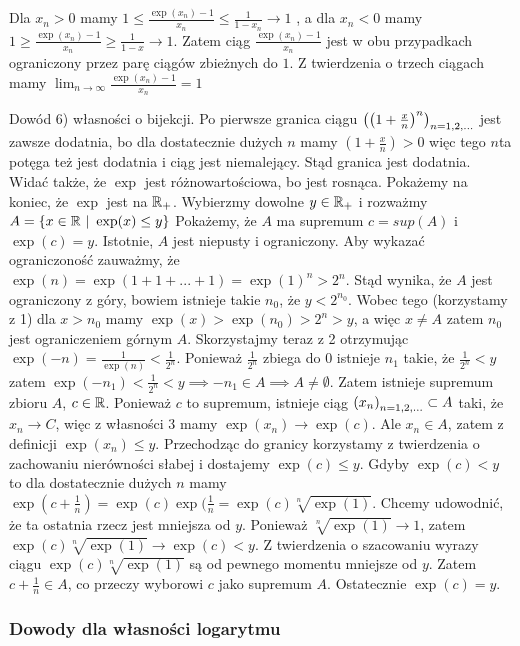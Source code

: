 \documentclass[9pt]{article}
\begin{document}
Dla $x_n > 0$ mamy $1 \le \frac{\exp(x_n) - 1}{x_n} \le \frac{1}{1-x_n} \to 1$ , a dla $x_n < 0$
mamy $1 \ge \frac{\exp(x_n) - 1}{x_n} \ge \frac{1}{1-x} \to 1$. Zatem ciąg $\frac{\exp(x_n) -
1}{x_n}$ jest w obu przypadkach ograniczony przez parę ciągów zbieżnych do $1$. Z twierdzenia o
trzech ciągach mamy $\lim_{n \to \infty} \frac{\exp(x_n)-1}{x_n} = 1$

\bigbreak

Dowód 6) własności o bijekcji. Po pierwsze granica ciągu $\left(\left(1+\frac{x}{n}\right)^n\right)_{n = 1,2,...}$ jest
zawsze dodatnia, bo dla dostatecznie dużych $n$ mamy $\left(1 + \frac{x}{n}\right) > 0$ więc tego
$n$ta potęga też jest dodatnia i ciąg jest niemalejący. Stąd granica jest dodatnia. Widać także, że
$\exp$ jest różnowartościowa, bo jest rosnąca. Pokażemy na koniec, że $\exp$ jest na $\mathbb{R}_+$.
Wybierzmy dowolne $y \in \mathbb{R}_+$ i rozważmy $A = \left\{x \in \mathbb{R} \ |\  \exp(x) \le y\right\}$ Pokażemy,
że $A$ ma supremum $c = sup(A)$ i $\exp(c) = y$. Istotnie, $A$ jest niepusty i ograniczony. Aby
wykazać ograniczoność zauważmy, że $\exp(n) = \exp(1 + 1 + ... + 1) = \exp(1)^n > 2^n$. Stąd wynika,
że $A$ jest ograniczony z góry, bowiem istnieje takie $n_0$, że $y < 2^{n_0}$. Wobec tego
(korzystamy z 1) dla $x > n_0$ mamy $\exp(x) > \exp(n_0) > 2^n > y$, a więc $x \ne A$ zatem $n_0$
jest ograniczeniem górnym $A$. Skorzystajmy teraz z 2 otrzymując $\exp(-n) = \frac{1}{\exp(n)} <
\frac{1}{2^n}$. Ponieważ $\frac{1}{2^n}$ zbiega do $0$ istnieje $n_1$ takie, że $\frac{1}{2^n} < y$
zatem $\exp(-n_1) < \frac{1}{2^n} < y \implies -n_1 \in A \implies A \ne \emptyset$. Zatem istnieje
supremum zbioru $A$, $c \in \mathbb{R}$. Ponieważ $c$ to supremum, istnieje ciąg $\left(x_n\right)_{n = 1,2,...} \subset A$ taki,
że $x_n \to C$, więc z własności 3 mamy $\exp(x_n) \to \exp(c)$. Ale $x_n \in A$, zatem z definicji
$\exp(x_n) \le y$. Przechodząc do granicy korzystamy z twierdzenia o zachowaniu nierówności słabej i
dostajemy $\exp(c) \le y$. Gdyby $\exp(c) < y$ to dla dostatecznie dużych $n$ mamy
$\exp(c+\frac{1}{n}) = \exp(c) \exp(\frac{1}{n} = \exp(c) \sqrt[n]{\exp(1)}$. Chcemy udowodnić, że
ta ostatnia rzecz jest mniejsza od $y$. Ponieważ $\sqrt[n]{\exp(1)} \to 1$, zatem $\exp(c)
\sqrt[n]{\exp(1)} \to \exp(c) < y$. Z twierdzenia o szacowaniu wyrazy ciągu $\exp(c)
\sqrt[n]{\exp(1)}$ są od pewnego momentu mniejsze od $y$. Zatem $c + \frac{1}{n} \in A$, co przeczy
wyborowi $c$ jako supremum $A$. Ostatecznie $\exp(c) = y$.

\subsubsection*{Dowody dla własności logarytmu}
\end{document}
